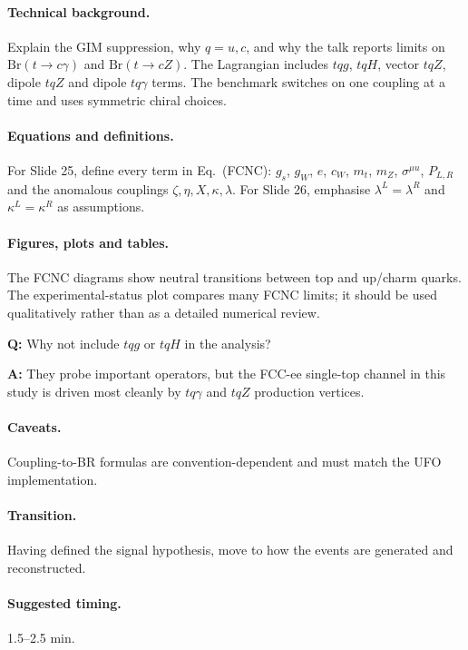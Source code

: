 \documentclass[11pt,a4paper]{report}
\newcommand{\br}{\mathrm{Br}}
\begin{document}
\paragraph{Technical background.}
Explain the GIM suppression, why $q=u,c$, and why the talk reports limits on $\br(t\to c\gamma)$ and $\br(t\to cZ)$.  The Lagrangian includes $tqg$, $tqH$, vector $tqZ$, dipole $tqZ$ and dipole $tq\gamma$ terms.  The benchmark switches on one coupling at a time and uses symmetric chiral choices.

\paragraph{Equations and definitions.}
For Slide 25, define every term in Eq.~(FCNC): $g_s$, $g_W$, $e$, $c_W$, $m_t$, $m_Z$, $\sigma^{\mu
u}$, $P_{L,R}$ and the anomalous couplings $\zeta,\eta,X,\kappa,\lambda$.  For Slide 26, emphasise $\lambda^L=\lambda^R$ and $\kappa^L=\kappa^R$ as assumptions.

\paragraph{Figures, plots and tables.}
The FCNC diagrams show neutral transitions between top and up/charm quarks.  The experimental-status plot compares many FCNC limits; it should be used qualitatively rather than as a detailed numerical review.

\begin{questionbox}
\textbf{Q:} Why not include $tqg$ or $tqH$ in the analysis?\par
\textbf{A:} They probe important operators, but the FCC-ee single-top channel in this study is driven most cleanly by $tq\gamma$ and $tqZ$ production vertices.
\end{questionbox}

\paragraph{Caveats.}
Coupling-to-BR formulas are convention-dependent and must match the UFO implementation.

\paragraph{Transition.}
Having defined the signal hypothesis, move to how the events are generated and reconstructed.

\paragraph{Suggested timing.}
1.5--2.5 min.
\end{document}
